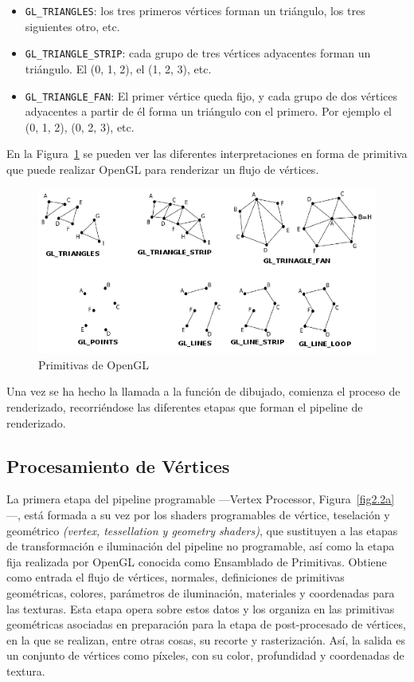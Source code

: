 \begin{itemize}
		\item \verb|GL_TRIANGLES|: los tres primeros vértices forman un
				triángulo, los tres siguientes otro, etc.
		\item \verb|GL_TRIANGLE_STRIP|: cada grupo de tres vértices adyacentes
				forman un triángulo. El (0, 1, 2), el (1, 2, 3), etc.
		\item \verb|GL_TRIANGLE_FAN|: El primer vértice queda fijo, y cada grupo
				de dos vértices adyacentes a partir de él forma un triángulo con
				el primero. Por ejemplo el (0, 1, 2), (0, 2, 3), etc.
\end{itemize}

En la Figura~\ref{fig:primitives} se pueden ver las diferentes interpretaciones
en forma de primitiva que puede realizar OpenGL para renderizar un flujo de
vértices. 

\begin{figure}[h]
	\centering	
	\includegraphics[width=\textwidth]{figures/primitives.png}
	\caption{Primitivas de OpenGL}
	\label{fig:primitives}
\end{figure}

Una vez se ha hecho la llamada a la función de dibujado, comienza el proceso de
renderizado, recorriéndose las diferentes etapas que forman el pipeline de
renderizado. 

\subsection{Procesamiento de Vértices}
\label{ref:procesamiento}

La primera etapa del pipeline programable ---Vertex Processor,
Figura~\ref{fig2.2a}---, está formada a su vez por los shaders programables de
vértice, teselación y geométrico \textit{(vertex, tessellation y geometry
shaders)}, que sustituyen a las etapas de transformación e iluminación del
pipeline no programable, así como la etapa fija realizada por OpenGL conocida
como Ensamblado de Primitivas. Obtiene como entrada el flujo de vértices,
normales, definiciones de primitivas geométricas, colores, parámetros de
iluminación, materiales y coordenadas para las texturas. Esta etapa opera sobre
estos datos y los organiza en las primitivas geométricas asociadas en
preparación para la etapa de post-procesado de vértices, en la que se realizan,
entre otras cosas, su recorte y rasterización.  Así, la salida es un conjunto de
vértices como píxeles, con su color, profundidad y coordenadas de textura.

